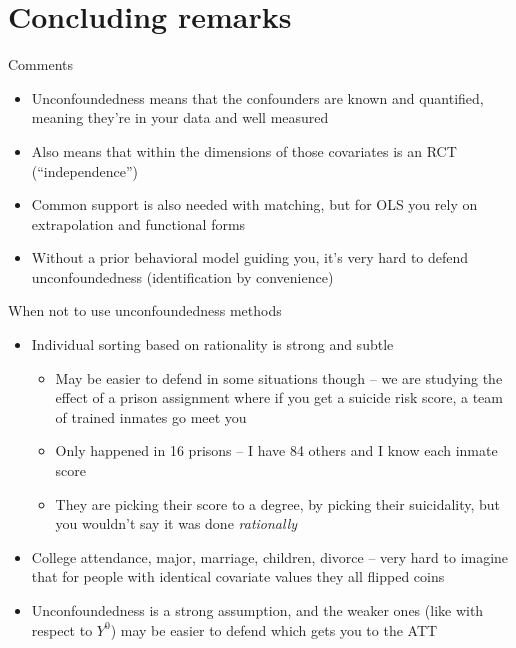 \documentclass{beamer}
\begin{document}
\section{Concluding remarks}




\begin{frame}{Comments}


\begin{itemize}

\item Unconfoundedness means that the confounders are known and quantified, meaning they're in your data and well measured
\item Also means that within the dimensions of those covariates is an RCT (``independence'')
\item Common support is also needed with matching, but for OLS you rely on extrapolation and functional forms
\item Without a prior behavioral model guiding you, it's very hard to defend unconfoundedness (identification by convenience) 

\end{itemize}

\end{frame}

\begin{frame}{When not to use unconfoundedness methods}

\begin{itemize}
\item Individual sorting based on rationality is strong and subtle
	\begin{itemize}
	\item May be easier to defend in some situations though -- we are studying the effect of a prison assignment where if you get a suicide risk score, a team of trained inmates go meet you
	\item Only happened in 16 prisons -- I have 84 others and I know each inmate score
	\item They are picking their score to a degree, by picking their suicidality, but you wouldn't say it was done \emph{rationally}
	\end{itemize}
\item College attendance, major, marriage, children, divorce -- very hard to imagine that for people with identical covariate values they all flipped coins
\item Unconfoundedness is a strong assumption, and the weaker ones (like with respect to $Y^0$) may be easier to defend which gets you to the ATT

\end{itemize}

\end{frame}  
\end{document}
